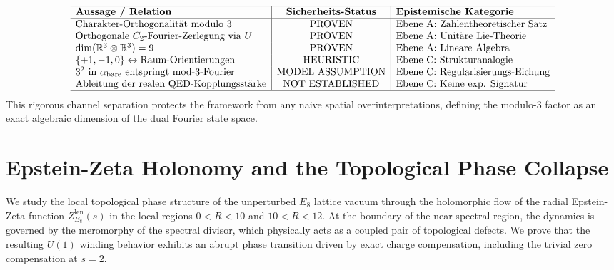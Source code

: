 \documentclass[11pt,a4paper]{article}
\theoremstyle{definition}
\begin{document}
	\begin{equation}
		\begin{array}{l|c|l}
			\hline
			\textbf{Aussage / Relation} & \textbf{Sicherheits-Status} & \textbf{Epistemische Kategorie} \\
			\hline
			\text{Charakter-Orthogonalit\"{a}t modulo } 3 & \mathrm{PROVEN} & \text{Ebene A: Zahlentheoretischer Satz} \\
			\text{Orthogonale } C_2\text{-Fourier-Zerlegung via } U & \mathrm{PROVEN} & \text{Ebene A: Unit\"{a}re Lie-Theorie} \\
			\dim(\mathbb{R}^3 \otimes \mathbb{R}^3) = 9 & \mathrm{PROVEN} & \text{Ebene A: Lineare Algebra} \\
			\{+1, -1, 0\} \leftrightarrow \text{Raum-Orientierungen} & \mathrm{HEURISTIC} & \text{Ebene C: Strukturanalogie} \\
			3^2 \text{ in } \alpha_{\text{bare}} \text{ entspringt mod-3-Fourier} & \mathrm{MODEL\ ASSUMPTION} & \text{Ebene C: Regularisierungs-Eichung} \\
			\text{Ableitung der realen QED-Kopplungsst\"{a}rke} & \mathrm{NOT\ ESTABLISHED} & \text{Ebene C: Keine exp. Signatur} \\
			\hline
		\end{array}
	\end{equation}
	This rigorous channel separation protects the framework from any naive spatial overinterpretations, defining the modulo-3 factor as an exact algebraic dimension of the dual Fourier state space.
	
	\newpage
	
	\section{Epstein-Zeta Holonomy and the Topological Phase Collapse}
	\label{sec:epstein_zeta_holonomy}
	
	We study the local topological phase structure of the unperturbed $E_8$ lattice vacuum through the holomorphic flow of the radial Epstein-Zeta function $Z^{\mathrm{len}}_{E_8}(s)$ in the local regions $0 < R < 10$ and $10 < R < 12$. At the boundary of the near spectral region, the dynamics is governed by the meromorphy of the spectral divisor, which physically acts as a coupled pair of topological defects. We prove that the resulting $U(1)$ winding behavior exhibits an abrupt phase transition driven by exact charge compensation, including the trivial zero compensation at $s = 2$.
	
\end{document}
